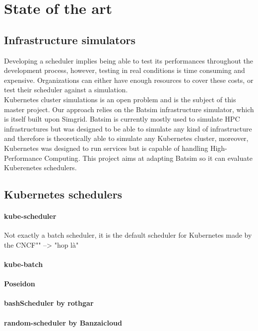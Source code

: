 \documentclass[12pt, a4paper]{memoir}
\begin{document}
\chapter{State of the art}
\section{Infrastructure simulators}

Developing a scheduler implies being able to test its performances throughout
the development process, however, testing in real conditions is time consuming
and expensive.  Organizations can either have enough resources to cover these
costs, or test their scheduler against a simulation.\\

Kubernetes cluster simulations is an open problem and is the subject of this
master project. Our approach relies on the Batsim\cite{batsim} infrastructure
simulator, which is itself built upon Simgrid\cite{simgrid}. Batsim is
currently mostly used to simulate HPC infrastructures but was designed to be
able to simulate any kind of infrastructure and therefore is theoretically able
to simulate any Kubernetes cluster, moreover, Kubernetes was designed to run
services but is capable of handling High-Performance
Computing\cite{kube-for-hpc}. This project aims at adapting Batsim so it can
evaluate Kuberenetes schedulers.

\section{Kubernetes schedulers}

\subsubsection*{kube-scheduler}
Not exactly a batch scheduler, it is the default scheduler for Kubernetes made
by the CNCF"" --> "hop là"
\subsubsection*{kube-batch}
\subsubsection*{Poseidon}
\subsubsection*{bashScheduler by rothgar}
\subsubsection*{random-scheduler by Banzaicloud}
\end{document}
